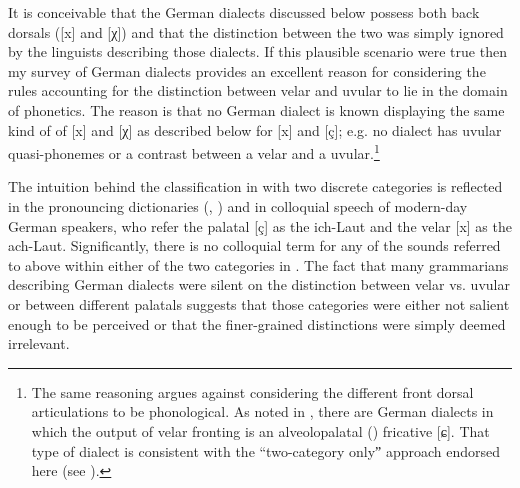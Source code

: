 It is conceivable that the German dialects discussed below possess both back dorsals  ([x] and [χ]) and that the distinction between the two was simply ignored by the linguists describing those dialects. If this plausible scenario were true then my survey of German dialects provides an excellent reason for considering the rules accounting for the distinction between velar and uvular to lie in the domain of phonetics. The reason is that no German dialect is known displaying the same kind of  of [x] and [χ] as described below for [x] and [ç]; e.g. no dialect has uvular quasi-phonemes or a contrast between a velar and a uvular.\footnote{The same reasoning argues against considering the different front dorsal articulations to be phonological. As noted in , there are German dialects in which the output of velar fronting is an alveolopalatal () fricative [ɕ]. That type of dialect is consistent with the “two-category onlyˮ approach endorsed here (see ).}

The intuition behind the classification in  with two discrete categories is reflected in the pronouncing dictionaries (\citealt{Siebs1969,Krech1982}, \citealt{Mangold2005}) and in colloquial speech of modern-day German speakers, who refer the palatal [ç] as the ich-Laut and the velar [x] as the ach-Laut. Significantly, there is no colloquial term for any of the sounds referred to above within either of the two categories in . The fact that many grammarians describing German dialects were silent on the distinction between velar vs. uvular or between different palatals suggests that those categories were either not salient enough to be perceived or that the finer-grained distinctions were simply deemed irrelevant.

